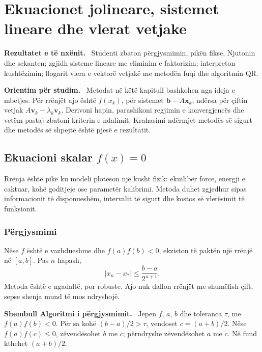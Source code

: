 \documentclass[11pt,oneside,openany]{book}
\newcommand{\vect}[1]{\bm{#1}}
\newenvironment{qellime}{\par\medskip\noindent\textbf{Rezultatet e të nxënit.}\ }{\par\medskip}
\newenvironment{shembull}[1][]{\par\medskip\noindent\textbf{Shembull #1.}\ }{\par\medskip}
\newenvironment{orientim}{\par\medskip\noindent\textbf{Orientim për studim.}\ }{\par\medskip}
\begin{document}




\chapter{Ekuacionet jolineare, sistemet lineare dhe vlerat vetjake}
\begin{qellime}
Studenti zbaton përgjysmimin, pikën fikse, Njutonin dhe sekanten; zgjidh sisteme lineare me eliminim e faktorizim; interpreton kushtëzimin; llogarit vlera e vektorë vetjakë me metodën fuqi dhe algoritmin QR.
\end{qellime}

\begin{orientim}
Metodat në këtë kapitull bashkohen nga ideja e mbetjes. Për rrënjët ajo është
$f(x_k)$, për sistemet $\vect b-A\vect x_k$, ndërsa për çiftin vetjak
$A\vect v_k-\lambda_k\vect v_k$. Derivoni hapin, parashikoni regjimin e
konvergjencës dhe vetëm pastaj zbatoni kriterin e ndalimit. Krahasimi ndërmjet
metodës së sigurt dhe metodës së shpejtë është pjesë e rezultatit.
\end{orientim}


\section{Ekuacioni skalar $f(x)=0$}
Rrënja është pikë ku modeli plotëson një kusht fizik: ekuilibër force, energji e caktuar, kohë goditjeje ose parametër kalibrimi. Metoda duhet zgjedhur sipas informacionit të disponueshëm, intervalit të sigurt dhe kostos së vlerësimit të funksionit.

\subsection{Përgjysmimi}
Nëse $f$ është e vazhdueshme dhe $f(a)f(b)<0$, ekziston të paktën një rrënjë në $[a,b]$. Pas $n$ hapash,
\begin{equation}
 |x_n-x_*|\le \frac{b-a}{2^{n+1}}.
\end{equation}
Metoda është e ngadaltë, por robuste. Ajo nuk dallon rrënjët me shumëfish çift, sepse shenja mund të mos ndryshojë.

\begin{shembull}[Algoritmi i përgjysmimit]
Jepen $f$, $a$, $b$ dhe toleranca $\tau$, me $f(a)f(b)<0$. Për sa kohë $(b-a)/2>\tau$, vendoset $c=(a+b)/2$. Nëse $f(a)f(c)\le0$, zëvendësohet $b$ me $c$; përndryshe zëvendësohet $a$ me $c$. Në fund kthehet $(a+b)/2$.
\end{shembull}
\end{document}
